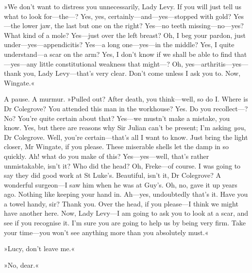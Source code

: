 »We don't want to distress you unnecessarily, Lady Levy. If you will just tell us what to look for\allowbreak---\allowbreak the---? Yes, yes, certainly\allowbreak---\allowbreak and---yes\allowbreak---\allowbreak stopped with gold? Yes\allowbreak---\allowbreak the lower jaw, the last but one on the right? Yes\allowbreak---\allowbreak no teeth missing\allowbreak---\allowbreak no---yes? What kind of a mole? Yes\allowbreak---\allowbreak just over the left breast? Oh, I beg your pardon, just under\allowbreak---\allowbreak yes---ap\-pen\-dici\-tis? Yes\allowbreak---\allowbreak a long one\allowbreak---\allowbreak yes---in the middle? Yes, I quite understand\allowbreak---\allowbreak a scar on the arm? Yes, I don't know if we shall be able to find that\allowbreak---\allowbreak yes---any little constitutional weakness that might---? Oh, yes\allowbreak---\allowbreak arthritis---yes\allowbreak---\allowbreak thank you, Lady Levy\allowbreak---\allowbreak that's very clear. Don't come unless I ask you to. Now, Wingate.«

A pause. A murmur. »Pulled out? After death, you think\allowbreak---\allowbreak well, so do I. Where is Dr Colegrove? You attended this man in the workhouse? Yes. Do you recollect---? No? You're quite certain about that? Yes\allowbreak---\allowbreak we mustn't make a mistake, you know. Yes, but there are reasons why Sir Julian can't be present; I'm asking \textit{you}, Dr Colegrove. Well, you're certain\allowbreak---\allowbreak that's all I want to know. Just bring the light closer, Mr Wingate, if you please. These miserable shells let the damp in so quickly. Ah! what do you make of this? Yes\allowbreak---\allowbreak yes---well, that's rather unmistakable, isn't it? Who did the head? Oh, Freke\allowbreak---\allowbreak of course. I was going to say they did good work at St Luke's. Beautiful, isn't it, Dr Colegrove? A wonderful surgeon\allowbreak---\allowbreak I saw him when he was at Guy's. Oh, no, gave it up years ago. Nothing like keeping your hand in. Ah\allowbreak---\allowbreak yes, undoubtedly that's it. Have you a towel handy, sir? Thank you. Over the head, if you please\allowbreak---\allowbreak I think we might have another here. Now, Lady Levy\allowbreak---\allowbreak I am going to ask you to look at a scar, and see if you recognise it. I'm sure you are going to help us by being very firm. Take your time\allowbreak---\allowbreak you won't see anything more than you absolutely must.«

»Lucy, don't leave me.«

»No, dear.«

